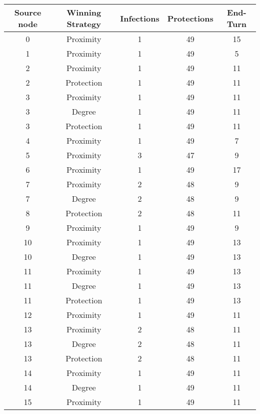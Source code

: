 \documentclass[results.tex]{subfiles}
\begin{document}
\begin{center}
  \begin{tabular}{| c || c | c | c | c |}
    \hline
    {\bfseries Source node} & {\bfseries Winning Strategy} & {\bfseries Infections} & {\bfseries Protections} & {\bfseries End-Turn} \\  %
    \hline\hline
    0 & Proximity & 1 & 49 & 15 \\ 
    \hline
    1 & Proximity & 1 & 49 & 5 \\ 
    \hline
    2 & Proximity & 1 & 49 & 11 \\ 
    \hline
    2 & Protection & 1 & 49 & 11 \\ 
    \hline
    3 & Proximity & 1 & 49 & 11 \\ 
    \hline
    3 & Degree & 1 & 49 & 11 \\ 
    \hline
    3 & Protection & 1 & 49 & 11 \\ 
    \hline
    4 & Proximity & 1 & 49 & 7 \\ 
    \hline
    5 & Proximity & 3 & 47 & 9 \\ 
    \hline
    6 & Proximity & 1 & 49 & 17 \\ 
    \hline
    7 & Proximity & 2 & 48 & 9 \\ 
    \hline
    7 & Degree & 2 & 48 & 9 \\ 
    \hline
    8 & Protection & 2 & 48 & 11 \\ 
    \hline
    9 & Proximity & 1 & 49 & 9 \\ 
    \hline
    10 & Proximity & 1 & 49 & 13 \\ 
    \hline
    10 & Degree & 1 & 49 & 13 \\ 
    \hline
    11 & Proximity & 1 & 49 & 13 \\ 
    \hline
    11 & Degree & 1 & 49 & 13 \\ 
    \hline
    11 & Protection & 1 & 49 & 13 \\ 
    \hline
    12 & Proximity & 1 & 49 & 11 \\ 
    \hline
    13 & Proximity & 2 & 48 & 11 \\ 
    \hline
    13 & Degree & 2 & 48 & 11 \\ 
    \hline
    13 & Protection & 2 & 48 & 11 \\ 
    \hline
    14 & Proximity & 1 & 49 & 11 \\ 
    \hline
    14 & Degree & 1 & 49 & 11 \\ 
    \hline
    15 & Proximity & 1 & 49 & 11 \\ 
    \hline

\end{tabular}
\end{center}
\end{document}
